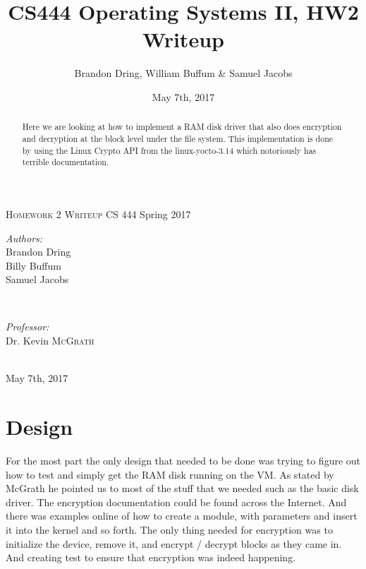 \documentclass{article}
\title{CS444 Operating Systems II, HW2 Writeup}
\author{Brandon Dring, William Buffum \& Samuel Jacobs}
\date{May 7th, 2017}
\begin{document}
\begin{titlepage}

\center

\textsc{\LARGE \hspace{15mm} Homework 2 Writeup} \newline \newline
{\large CS 444 Spring 2017}



\begin{minipage}{0.4\textwidth}
   \begin{flushleft} \large
      \emph{Authors:}\\
      Brandon Dring \\
      Billy Buffum \\
      Samuel Jacobs
   \end{flushleft}
\end{minipage}
~
\begin{minipage}{0.4\textwidth}
   \begin{flushright} \large
      \emph{Professor:} \\
      Dr. Kevin \textsc{McGrath} %
   \end{flushright}
\end{minipage} \\ [4cm]

{\large May 7th, 2017}
\vfill %

\begin{abstract}
    Here we are looking at how to implement a RAM disk driver that also does encryption and decryption at the block level under the file system. This implementation is done by using the Linux Crypto API from the linux-yocto-3.14 which notoriously has terrible documentation.
\end{abstract}

\pagebreak

\end{titlepage}
\newpage
{}
\setlength{\pdfpageheight}{\paperheight}
\setlength{\pdfpagewidth}{\paperwidth}


\section{Design}
    For the most part the only design that needed to be done was trying to figure out how to test and simply get the RAM disk running on the VM. As stated by McGrath he pointed us to most of the stuff that we needed such as the basic disk driver. The encryption documentation could be found across the Internet. And there was examples online of how to create a module, with parameters and insert it into the kernel and so forth. The only thing needed for encryption was to initialize the device, remove it, and encrypt / decrypt blocks as they came in. And creating test to ensure that encryption was indeed happening.
\end{document}
